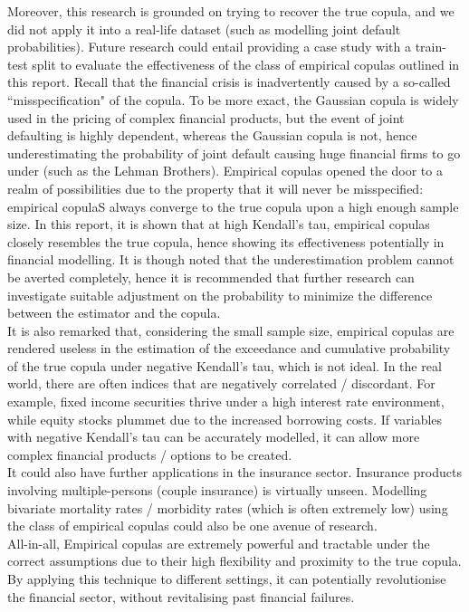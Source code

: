 \documentclass[12pt]{report}
\newcommand{\1}{\mathbf{1}}
\begin{document}
\begin{flushleft}
\vspace{0.5cm}
Moreover, this research is grounded on trying to recover the true copula, and we did not apply it into a real-life dataset (such as modelling joint default probabilities). Future research could entail providing a case study with a train-test split to evaluate the effectiveness of the class of empirical copulas outlined in this report. Recall that the financial crisis is inadvertently caused by a so-called ``misspecification" of the copula. To be more exact, the Gaussian copula is widely used in the pricing of complex financial products, but the event of joint defaulting is highly dependent, whereas the Gaussian copula is not, hence underestimating the probability of joint default causing huge financial firms to go under (such as the Lehman Brothers). Empirical copulas opened the door to a realm of possibilities due to the property that it will never be misspecified: empirical copulaS always converge to the true copula upon a high enough sample size. In this report, it is shown that at high Kendall's tau, empirical copulas closely resembles the true copula, hence showing its effectiveness potentially in financial modelling. It is though noted that the underestimation problem cannot be averted completely, hence it is recommended that further research can investigate suitable adjustment on the probability to minimize the difference between the estimator and the copula.\\
\vspace{0.5cm}
It is also remarked that, considering the small sample size, empirical copulas are rendered useless in the estimation of the exceedance and cumulative probability of the true copula under negative Kendall's tau, which is not ideal. In the real world, there are often indices that are negatively correlated / discordant. For example, fixed income securities thrive under a high interest rate environment, while equity stocks plummet due to the increased borrowing costs. If variables with negative Kendall's tau can be accurately modelled, it can allow more complex financial products / options to be created.\\
\vspace{0.5cm}
It could also have further applications in the insurance sector. Insurance products involving multiple-persons (couple insurance) is virtually unseen. Modelling bivariate mortality rates / morbidity rates (which is often extremely low) using the class of empirical copulas could also be one avenue of research.\\
\vspace{0.5cm}
All-in-all, Empirical copulas are extremely powerful and tractable under the correct assumptions due to their high flexibility and proximity to the true copula. By applying this technique to different settings, it can potentially revolutionise the financial sector, without revitalising past financial failures.



\end{flushleft}
 
\end{document}
